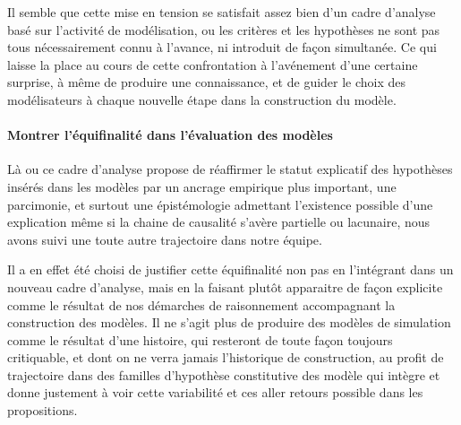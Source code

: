 Il semble que cette mise en tension se satisfait assez bien d'un cadre d'analyse basé sur l'activité de modélisation, ou les critères et les hypothèses ne sont pas tous nécessairement connu à l'avance, ni introduit de façon simultanée. Ce qui laisse la place au cours de cette confrontation à l'avénement d'une certaine surprise, à même de produire une connaissance, et de guider le choix des modélisateurs à chaque nouvelle étape dans la construction du modèle. 











\paragraph{Montrer l'équifinalité dans l'évaluation des modèles}

Là ou ce cadre d'analyse propose de réaffirmer le statut explicatif des hypothèses insérés dans les modèles par un ancrage empirique plus important, une parcimonie, et surtout une épistémologie admettant l'existence possible d'une explication même si la chaine de causalité s'avère partielle ou lacunaire, nous avons suivi une toute autre trajectoire dans notre équipe.

Il a en effet été choisi de justifier cette équifinalité non pas en l'intégrant dans un nouveau cadre d'analyse, mais en la faisant plutôt apparaitre de façon explicite comme le résultat de nos démarches de raisonnement accompagnant la construction des modèles. Il ne s'agit plus de produire des modèles de simulation comme le résultat d'une histoire, qui resteront de toute façon toujours critiquable, et dont on ne verra jamais l'historique de construction, au profit de trajectoire dans des familles d'hypothèse constitutive des modèle qui intègre et donne justement à voir cette variabilité et ces aller retours possible dans les propositions.

